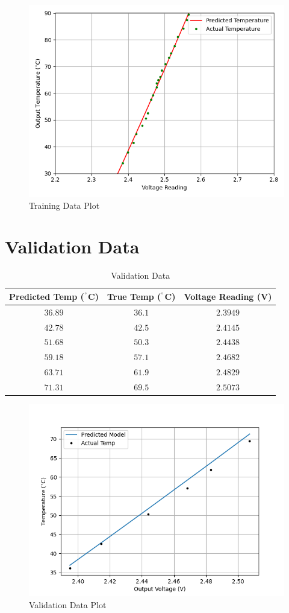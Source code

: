 \documentclass{article}
\begin{document}
\begin{figure}[H]
    \centering
    \includegraphics[width=0.8\columnwidth]{figs/train.png}
    \caption{Training Data Plot}
    \label{fig:trainplot}
\end{figure}

\newpage
\section{Validation Data}
\begin{table}[H]
    \centering
    \caption{Validation Data}
    \begin{tabular}{ccc}
        \toprule
        Predicted Temp ($^{\degree}$C) & True Temp ($^{\degree}$C) & Voltage Reading (V) \\
        \midrule
        $36.89$ & $36.1$ & $2.3949$ \\
        $42.78$ & $42.5$ & $2.4145$ \\
        $51.68$ & $50.3$ & $2.4438$ \\
        $59.18$ & $57.1$ & $2.4682$ \\
        $63.71$ & $61.9$ & $2.4829$ \\
        $71.31$ & $69.5$ & $2.5073$ \\
        \bottomrule
    \end{tabular}
    \label{tab:validationdata}
\end{table}


\begin{figure}[H]
    \centering
    \includegraphics[width=0.8\columnwidth]{figs/valid.png}
    \caption{Validation Data Plot}
    \label{fig:validplot}
\end{figure}
\end{document}
